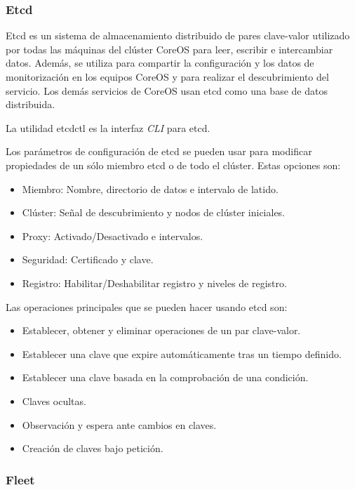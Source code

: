 \subsubsection{Etcd}

Etcd es un sistema de almacenamiento distribuido de pares clave-valor utilizado por todas las máquinas del clúster CoreOS para leer, escribir e intercambiar datos. Además, se utiliza para compartir la configuración y los datos de monitorización en los equipos CoreOS y para realizar el descubrimiento del servicio. Los demás servicios de CoreOS usan etcd como una base de datos distribuida. 

La utilidad etcdctl es la interfaz \textit{CLI} para etcd.

Los parámetros de configuración de etcd se pueden usar para modificar propiedades de un sólo miembro etcd o de todo el clúster. Estas opciones son:

\begin{itemize}
\item Miembro: Nombre, directorio de datos e intervalo de latido.
\item Clúster: Señal de descubrimiento y nodos de clúster iniciales.
\item Proxy: Activado/Desactivado e intervalos.
\item Seguridad: Certificado y clave.
\item Registro: Habilitar/Deshabilitar registro y niveles de registro.
\end{itemize}

Las operaciones principales que se pueden hacer usando etcd son:

\begin{itemize}
\item Establecer, obtener y eliminar operaciones de un par clave-valor.
\item Establecer una clave que expire automáticamente tras un tiempo definido. 
\item Establecer una clave basada en la comprobación de una condición.
\item Claves ocultas.
\item Observación y espera ante cambios en claves.
\item Creación de claves bajo petición.
\end{itemize}

\subsubsection{Fleet} \label{fleet}

